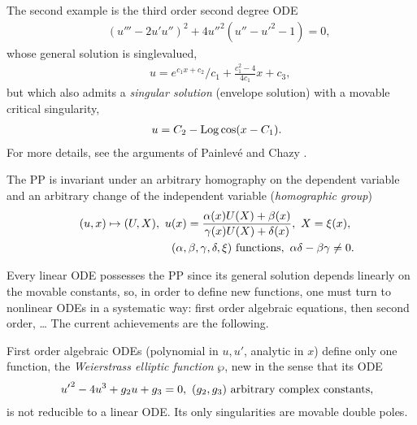 \documentclass[10pt]{article}
\begin{document}
The second example \cite[p.~360]{ChazyThese} is the third order second degree
ODE
\begin{eqnarray}
& &
(u''' -2 u' u'')^2 + 4 u''^2 (u'' - u'^2 - 1)=0,\
\end{eqnarray}
whose general solution is singlevalued,
\begin{eqnarray}
& &
u=e^{c_1 x + c_2}/c_1 + \frac{c_1^2-4}{4 c_1} x + c_3,
\end{eqnarray}
but which also admits a \textit{singular solution}
(envelope solution)
with a movable critical singularity,
\begin{eqnarray}
& &
u=C_2 - \mathop{\rm Log}\nolimits \cos(x-C_1).
\end{eqnarray}
For more details,
see the arguments of Painlev\'e \cite[\S 2.6]{Cargese1996Conte}
and Chazy \cite[\S 5.1]{Cargese1996Conte}.

The PP is invariant under an arbitrary homography on the dependent variable
and an arbitrary change of the independent variable
(\textit{homographic group})
\begin{eqnarray}
& &
(u,x) \mapsto (U,X),\
u(x)=\frac{\alpha(x) U(X) + \beta(x)}{\gamma(x) U(X) + \delta(x)},\
X=\xi(x),\
\nonumber
\\
& &
 (\alpha, \beta, \gamma, \delta, \xi) \hbox{ functions},\
\alpha \delta - \beta \gamma \not=0.
\label{eqHomographicGroup}
\end{eqnarray}

Every linear ODE possesses the PP since its general solution depends linearly
on the movable constants,
so, in order to define new functions,
one must turn to nonlinear ODEs in a systematic way:
first order algebraic equations, then second order, \dots
The current achievements are the following.

First order algebraic ODEs (polynomial in $u,u'$, analytic in $x$)
define only one function, the
\textit{Weierstrass elliptic function} $\wp$,
new in the sense that its ODE
\begin{eqnarray}
& &
{u'}^2-4 u^3 + g_2 u + g_3=0,\
(g_2,g_3) \hbox{ arbitrary complex constants},
\label{eqWeierstrassOrder1}
\end{eqnarray}
is not reducible to a linear ODE.
Its only singularities are movable double poles.
\end{document}
